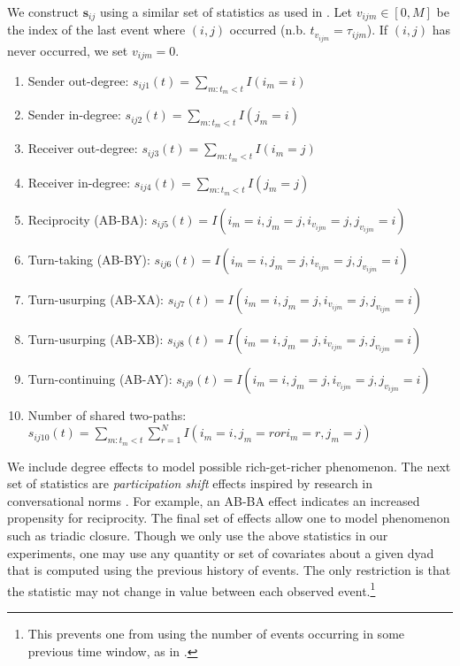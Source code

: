 \documentclass{article}
\begin{document}
We construct $\mathbf{s}_{ij}$ using a similar set of statistics as used in \cite{Butts2008,Vu2011}. Let $v_{ijm} \in [0,M]$ be the index of the last event where $(i,j)$ occurred (n.b. $t_{v_{ijm}} = \tau_{ijm}$). If $(i,j)$ has never occurred, we set $v_{ijm}=0$.  
\begin{enumerate}
\item Sender out-degree: $s_{ij1}(t) = \sum_{m:t_m<t} I(i_m=i)$
\item Sender in-degree: $s_{ij2}(t) = \sum_{m:t_m<t} I(j_m=i)$
\item Receiver out-degree: $s_{ij3}(t) = \sum_{m:t_m<t} I(i_m=j)$
\item Receiver in-degree: $s_{ij4}(t) = \sum_{m:t_m<t} I(j_m=j)$
\item Reciprocity (AB-BA): $s_{ij5}(t) = I(i_m=i,j_m=j,i_{v_{ijm}}=j,j_{v_{ijm}}=i)$
\item Turn-taking (AB-BY): $s_{ij6}(t) = I(i_m=i,j_m=j,i_{v_{ijm}}=j,j_{v_{ijm}}=i)$
\item Turn-usurping (AB-XA): $s_{ij7}(t) = I(i_m=i,j_m=j,i_{v_{ijm}}=j,j_{v_{ijm}}=i)$
\item Turn-usurping (AB-XB): $s_{ij8}(t) = I(i_m=i,j_m=j,i_{v_{ijm}}=j,j_{v_{ijm}}=i)$
\item Turn-continuing (AB-AY): $s_{ij9}(t) =  I(i_m=i,j_m=j,i_{v_{ijm}}=j,j_{v_{ijm}}=i)$
\item Number of shared two-paths: $s_{ij10}(t) =   \sum_{m:t_m<t} \sum_{r=1}^NI(i_m=i,j_m=r or i_m=r,j_m=j)$
\end{enumerate}

We include degree effects to model possible rich-get-richer phenomenon.  The next set of statistics are \emph{participation shift} effects inspired by research in conversational norms \cite{Gibson2003}.  For example, an AB-BA effect indicates an increased propensity for reciprocity.  The final set of effects allow one to model phenomenon such as triadic closure.  Though we only use the above statistics in our experiments, one may use any quantity or set of covariates about a given dyad that is computed using the previous history of events.  The only restriction is that the statistic may not change in value between each observed event.\footnote{This prevents one from using the number of events occurring in some previous time window, as in \cite{Gunawardana2011}.}
\end{document}
